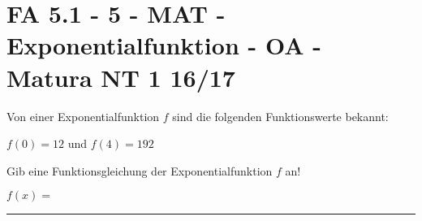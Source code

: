 \section{FA 5.1 - 5 - MAT - Exponentialfunktion - OA - Matura NT 1 16/17}

\begin{beispiel}[FA 5.1]{1} %
Von einer Exponentialfunktion $f$ sind die folgenden Funktionswerte bekannt:

$f(0)=12$ und $f(4)=192$

Gib eine Funktionsgleichung der Exponentialfunktion $f$ an!\leer

$f(x)=$ \rule{3cm}{0.3pt}

\end{beispiel}